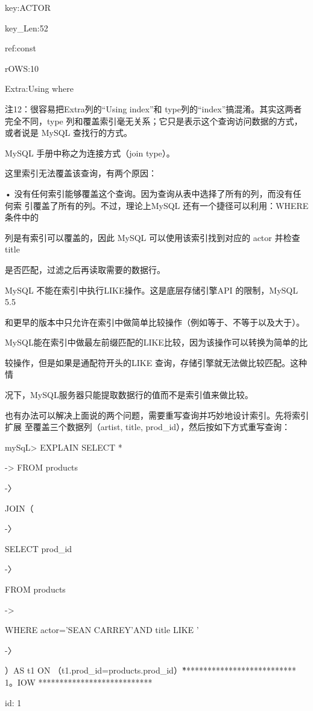key:ACTOR

key\_Len:52

ref:const

rOWS:10

Extra:Using where

注12：很容易把Extra列的“Using index”和 type列的“index”搞混淆。其实这两者完全不同，type
列和覆盖索引毫无关系；它只是表示这个查询访问数据的方式，或者说是 MySQL 查找行的方式。

MySQL 手册中称之为连接方式（join type）。

这里索引无法覆盖该查询，有两个原因：

• 没有任何索引能够覆盖这个查询。因为查询从表中选择了所有的列，而没有任何索
引覆盖了所有的列。不过，理论上MySQL 还有一个捷径可以利用：WHERE 条件中的

列是有索引可以覆盖的，因此 MySQL 可以使用该索引找到对应的 actor 并检查 title

是否匹配，过滤之后再读取需要的数据行。

MySQL 不能在索引中执行LIKE操作。这是底层存储引擎API 的限制，MySQL 5.5

和更早的版本中只允许在索引中做简单比较操作（例如等于、不等于以及大于）。

MySQL能在索引中做最左前缀匹配的LIKE比较，因为该操作可以转换为简单的比

较操作，但是如果是通配符开头的LIKE 查询，存储引擎就无法做比较匹配。这种情

况下，MySQL服务器只能提取数据行的值而不是索引值来做比较。

也有办法可以解决上面说的两个问题，需要重写查询并巧妙地设计索引。先将索引扩展
至覆盖三个数据列（artist, title, prod\_id），然后按如下方式重写查询：

mySqL> EXPLAIN SELECT *

-> FROM products

-〉

JOIN（

-〉

SELECT prod\_id

-〉

FROM products

->

WHERE actor='SEAN CARREY'AND title LIKE '%

-〉

）AS t1 ON （t1.prod\_id=products.prod\_id）\G

*************************** 1。IOW ***************************

id: 1


